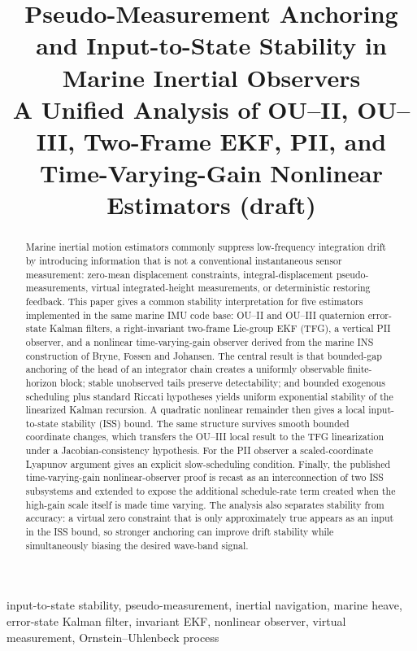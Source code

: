 \documentclass[conference]{IEEEtran}
\title{Pseudo-Measurement Anchoring and Input-to-State Stability in Marine Inertial Observers\\
\large A Unified Analysis of OU--II, OU--III, Two-Frame EKF, PII, and Time-Varying-Gain Nonlinear Estimators (draft)}
\author{%
  \IEEEauthorblockN{Mikhail S. Grushinskiy}
  \IEEEauthorblockA{Independent Researcher, USA, Fair Lawn\\
  Bareboat Necessities GitHub Project\\
  Email: mgrouch@users.github.com}%
}
\theoremstyle{remark}
\begin{document}
\maketitle

\begin{abstract}
Marine inertial motion estimators commonly suppress low-frequency integration
drift by introducing information that is not a conventional instantaneous
sensor measurement: zero-mean displacement constraints, integral-displacement
pseudo-measurements, virtual integrated-height measurements, or deterministic
restoring feedback.  This paper gives a common stability interpretation for
five estimators implemented in the same marine IMU code base: OU--II and
OU--III quaternion error-state Kalman filters, a right-invariant two-frame
Lie-group EKF (TFG), a vertical PII observer, and a nonlinear time-varying-gain
observer derived from the marine INS construction of Bryne, Fossen and
Johansen.  The central result is that bounded-gap anchoring of the head of an
integrator chain creates a uniformly observable finite-horizon block; stable
unobserved tails preserve detectability; and bounded exogenous scheduling plus
standard Riccati hypotheses yields uniform exponential stability of the
linearized Kalman recursion.  A quadratic nonlinear remainder then gives a
local input-to-state stability (ISS) bound.  The same structure survives smooth
bounded coordinate changes, which transfers the OU--III local result to the
TFG linearization under a Jacobian-consistency hypothesis.  For the PII
observer a scaled-coordinate Lyapunov argument gives an explicit slow-scheduling
condition.  Finally, the published time-varying-gain nonlinear-observer proof is
recast as an interconnection of two ISS subsystems and extended to expose the
additional schedule-rate term created when the high-gain scale itself is made
time varying.  The analysis also separates stability from accuracy: a virtual
zero constraint that is only approximately true appears as an input in the ISS
bound, so stronger anchoring can improve drift stability while simultaneously
biasing the desired wave-band signal.
\end{abstract}

\begin{IEEEkeywords}
input-to-state stability, pseudo-measurement, inertial navigation, marine
heave, error-state Kalman filter, invariant EKF, nonlinear observer, virtual
measurement, Ornstein--Uhlenbeck process
\end{IEEEkeywords}
\end{document}
